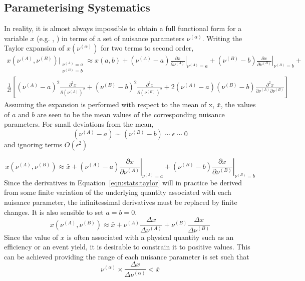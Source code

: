 \subsection{Parameterising Systematics}
In reality, it is almost always impossible to obtain a full functional form for
a variable $x$ (e.g. \RCSi, \NControli) in terms of a set of nuisance parameters
$\nu^{(\alpha)}$. Writing the Taylor expansion of $x(\nu^{(\alpha)})$ for two terms to
second order,
\begin{align*}
 x(\nu^{(A)}, \nu^{(B)})\bigg|_{\substack{\nu^{(A)} = a\\ \nu^{(B)} = b}} \approx
x(a,b) +
(\nu^{(A)} - a)\left.\frac{\partial x}{\partial\nu^{(A)}}\right|_{\nu^{(A)}=a} +
(\nu^{(B)} - b)\left.\frac{\partial x}{\partial\nu^{(B)}}\right|_{\nu^{(B)}=b} +\\
\frac{1}{2!}\left[
(\nu^{(A)} - a)^2 \frac{\partial^2 x}{\partial \left(\nu^{(A)}\right)^2}
+ (\nu^{(B)} - b)^2 \frac{\partial^2 x}{\partial \left(\nu^{(B)}\right)^2}
+ 2(\nu^{(A)} - a)(\nu^{(B)} - b)\frac{\partial^2 x}{\partial
  \nu^{(A)}\partial\nu^{(B)}}
\right]
\end{align*}
Assuming the expansion is performed with respect to the mean of x, $\bar{x}$,
the values of $a$ and $b$ are seen to be the mean values of the corresponding nuisance
parameters. For small deviations from the mean,
\begin{equation}
 (\nu^{(A)} - a) \sim (\nu^{(B)} - b) \sim \epsilon \sim 0
\end{equation}
and ignoring terms $O(\epsilon^2)$

\begin{equation}
x(\nu^{(A)}, \nu^{(B)}) \approx \bar{x} +
(\nu^{(A)} - a)\left.\frac{\partial x}{\partial\nu^{(A)}}\right|_{\nu^{(A)}=a} +
(\nu^{(B)} - b)\left.\frac{\partial x}{\partial\nu^{(B)}}\right|_{\nu^{(B)}=b}
\label{eqn:stats:taylor}
\end{equation}
Since the derivatives in Equation~\ref{eqn:stats:taylor} will in practice be
derived from some finite variation of the underlying quantity associated with
each nuisance parameter, the infinitessimal derivatives must be replaced by
finite changes. It is also sensible to set $a=b=0$.
\begin{equation}
x(\nu^{(A)}, \nu^{(B)}) \approx \bar{x} +
\nu^{(A)}\frac{\Delta x}{\Delta\nu^{(A)}} +
\nu^{(B)}\frac{\Delta x}{\Delta\nu^{(B)}}
\label{eqn:stats:taylor2}
\end{equation}
Since the value of $x$ is often associated with a physical quantity such as an
efficiency or an event yield, it is desirable to constrain it to positive
values. This can be achieved providing the range of each nuisance parameter is
set such that
\begin{equation}
\nu^{(\alpha)}\times\frac{\Delta x}{\Delta \nu^{(\alpha)}} < \bar{x}
\end{equation}

